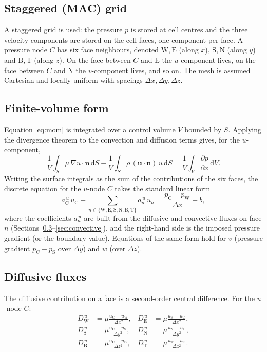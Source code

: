 \documentclass[11pt,a4paper]{article}
\newcommand{\vc}[1]{\mathbf{#1}}            %
\newcommand{\dvc}[1]{\mathrm{d}\!#1}
\newcommand{\cw}{\mathrm{W}}
\newcommand{\ce}{\mathrm{E}}
\newcommand{\cn}{\mathrm{N}}
\newcommand{\cs}{\mathrm{S}}
\newcommand{\ct}{\mathrm{T}}
\newcommand{\cb}{\mathrm{B}}
\newcommand{\cc}{\mathrm{C}}
\begin{document}
\subsection{Staggered (MAC) grid}

A staggered grid is used: the pressure $p$ is stored at cell centres and the
three velocity components are stored on the cell faces, one component per
face.  A pressure node $C$ has six face neighbours, denoted
$\cw,\ce$ (along $x$), $\cs,\cn$ (along $y$) and $\cb,\ct$ (along $z$).
On the face between $C$ and $\ce$ the $u$-component lives, on the face between
$C$ and $\cn$ the $v$-component lives, and so on.  The mesh is assumed
Cartesian and locally uniform with spacings $\Delta x,\Delta y,\Delta z$.

\subsection{Finite-volume form}

Equation \eqref{eq:mom} is integrated over a control volume $V$ bounded by
$S$.  Applying the divergence theorem to the convection and diffusion terms
gives, for the $u$-component,
\begin{equation}
\frac{1}{V}\!\int_{S}\!\mu\,\nabla u\!\cdot\!\vc{n}\,\dvc{S}
-\frac{1}{V}\!\int_{S}\!\rho\,(\vc{u}\!\cdot\!\vc{n})\,u\,\dvc{S}
=\frac{1}{V}\!\int_{V}\frac{\partial p}{\partial x}\,\dvc{V} .
\end{equation}
Writing the surface integrals as the sum of the contributions of the six
faces, the discrete equation for the $u$-node $C$ takes the standard linear
form
\begin{equation}
a^{\,u}_{\cc}\,u_{\cc}+\sum_{n\in\{\cw,\ce,\cs,\cn,\cb,\ct\}} a^{\,u}_{n}\,u_{n}
=\frac{p_{\cc}-p_{\cw}}{\Delta x}+b ,
\label{eq:discrete-u}
\end{equation}
where the coefficients $a^{\,u}_{n}$ are built from the diffusive and
convective fluxes on face $n$ (Sections~\ref{sec:diffusive}--\ref{sec:convective}),
and the right-hand
side is the imposed pressure gradient (or the boundary value).  Equations of
the same form hold for $v$ (pressure gradient $p_{\cc}-p_{\cs}$ over
$\Delta y$) and $w$ (over $\Delta z$).

\subsection{Diffusive fluxes}
\label{sec:diffusive}

The diffusive contribution on a face is a second-order central difference.
For the $u$-node $C$:
\begin{align}
D^{\,u}_{\cw}&=\mu\frac{u_{\cc}-u_{\cw}}{\Delta x^{2}},
&
D^{\,u}_{\ce}&=\mu\frac{u_{\ce}-u_{\cc}}{\Delta x^{2}},\\[2pt]
D^{\,u}_{\cs}&=\mu\frac{u_{\cc}-u_{\cs}}{\Delta y^{2}},
&
D^{\,u}_{\cn}&=\mu\frac{u_{\cn}-u_{\cc}}{\Delta y^{2}},\\[2pt]
D^{\,u}_{\cb}&=\mu\frac{u_{\cc}-u_{\cb}}{\Delta z^{2}},
&
D^{\,u}_{\ct}&=\mu\frac{u_{\ct}-u_{\cc}}{\Delta z^{2}} .
\end{align}
\end{document}
